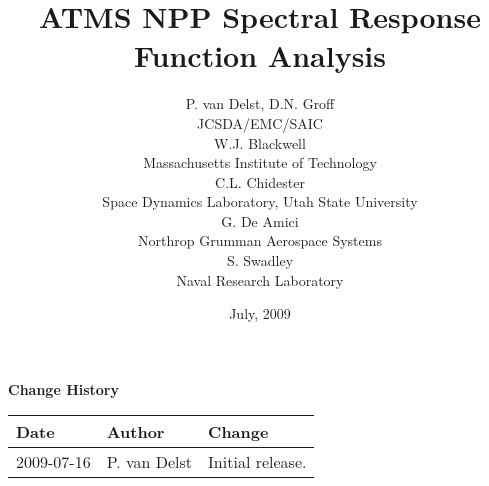 



\newcommand{\frequency}[1]{\ensuremath{f_{#1}}}
\newcommand{\bfrequency}[1]{\boldmath\frequency{#1}\unboldmath}
\newcommand{\bdf}[1]{\boldmath\df{#1}\unboldmath}
\newcommand{\sideband}[1]{\ensuremath{df_{#1}}}
\newcommand{\bsideband}[1]{\boldmath\sideband{#1}\unboldmath}
\newcommand{\bdeltaf}{\boldmath\ensuremath{\Delta f}\unboldmath}
\newcommand{\up}[1]{\superscript{#1}}

\title{ATMS NPP Spectral Response Function Analysis}
\author{P. van Delst,
        D.N. Groff\\JCSDA/EMC/SAIC\\[0.25in]
        W.J. Blackwell\\Massachusetts Institute of Technology\\[0.25in]
        C.L. Chidester\\Space Dynamics Laboratory, Utah State University\\[0.25in]
        G. De Amici\\Northrop Grumman Aerospace Systems\\[0.25in]
        S. Swadley\\Naval Research Laboratory}
\date{July, 2009}



\maketitle

\draftwatermark

\thispagestyle{empty}
\vspace*{10cm}
\begin{center}
  {\sffamily\Large\bfseries Change History}
  \begin{table}[htp]
    \centering
    \begin{tabular}{|p{2cm}|p{3cm}|p{8cm}|}
      \hline
      \sffamily\textbf{Date} & \sffamily\textbf{Author} & \sffamily\textbf{Change}\\
      \hline\hline
      2009-07-16 & P. van Delst & Initial release.\\
      \hline
    \end{tabular}
  \end{table}
\end{center}
\clearpage
{}
\setcounter{page}{1}


